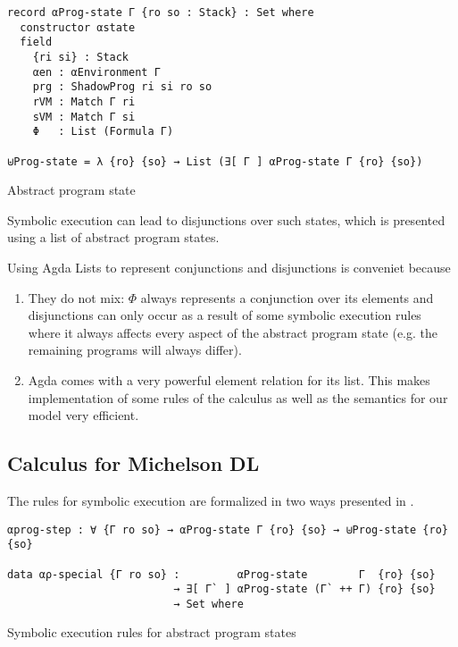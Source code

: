 \begin{listing}[!ht]
\begin{verbatim}
record αProg-state Γ {ro so : Stack} : Set where
  constructor αstate
  field
    {ri si} : Stack
    αen : αEnvironment Γ
    prg : ShadowProg ri si ro so
    rVM : Match Γ ri
    sVM : Match Γ si
    Φ   : List (Formula Γ)

⊎Prog-state = λ {ro} {so} → List (∃[ Γ ] αProg-state Γ {ro} {so})
\end{verbatim}
\caption{Abstract program state}
\label{aProg-state}
\end{listing}

Symbolic execution can lead to disjunctions over such states, which is presented using
a list of abstract program states.

Using Agda Lists to represent conjunctions and disjunctions is conveniet because
\begin{enumerate}
	\item	They do not mix: $\Phi$ always represents a conjunction over its elements
		and disjunctions can only occur as a result of some symbolic execution rules
		where it always affects every aspect of the abstract program state
		(e.g. the remaining programs will always differ).
	\item	Agda comes with a very powerful element relation for its list.
		This makes implementation of some rules of the calculus
		as well as the semantics for our model very efficient.
\end{enumerate}

\subsection{Calculus for Michelson DL}\label{sec:calculus}

The rules for symbolic execution are formalized in two ways presented in .
\begin{listing}[!ht]
\begin{verbatim}
αprog-step : ∀ {Γ ro so} → αProg-state Γ {ro} {so} → ⊎Prog-state {ro} {so}

data αρ-special {Γ ro so} :         αProg-state        Γ  {ro} {so}
                          → ∃[ Γ` ] αProg-state (Γ` ++ Γ) {ro} {so}
                          → Set where
\end{verbatim}
\caption{Symbolic execution rules for abstract program states}
\label{aprog-all}
\end{listing}

